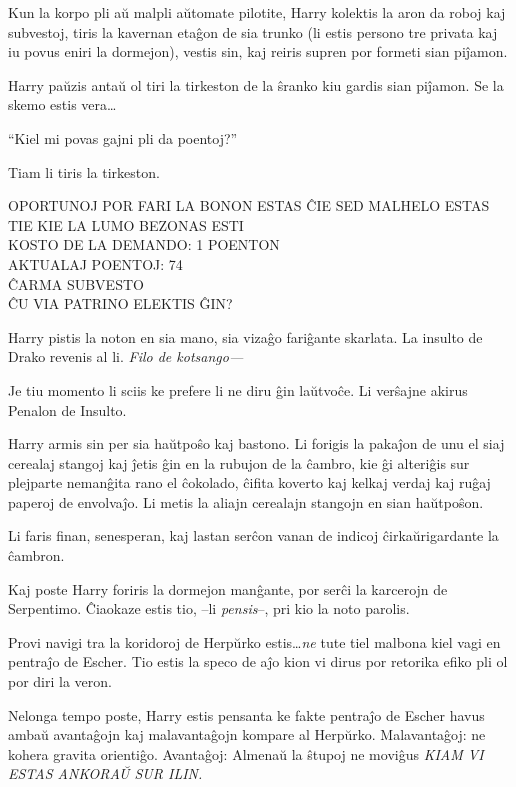Kun la korpo pli aŭ malpli aŭtomate pilotite, Harry kolektis la aron
da roboj kaj subvestoj, tiris la kavernan etaĝon de sia trunko (li estis
persono tre privata kaj iu povus eniri la dormejon), vestis
sin, kaj reiris supren por formeti sian piĵamon.

Harry paŭzis antaŭ ol tiri la tirkeston de la ŝranko kiu gardis sian piĵamon. Se
la skemo estis vera\ldots

``Kiel mi povas gajni pli da poentoj?''

Tiam li tiris la tirkeston.

\begin{center}
OPORTUNOJ POR FARI LA BONON ESTAS ĈIE SED MALHELO ESTAS TIE KIE LA
LUMO BEZONAS ESTI \\
KOSTO DE LA DEMANDO: 1 POENTON\\
AKTUALAJ POENTOJ: 74\\
ĈARMA SUBVESTO \\
ĈU VIA PATRINO ELEKTIS ĜIN? \\
\end{center}

Harry pistis la noton en sia mano, sia vizaĝo fariĝante skarlata. La
insulto de Drako revenis al li. \emph{Filo de kotsango—}

Je tiu momento li sciis ke prefere li ne diru ĝin laŭtvoĉe. Li
verŝajne akirus Penalon de Insulto.

Harry armis sin per sia haŭtpoŝo kaj bastono. Li forigis la pakaĵon de unu el
siaj cerealaj stangoj kaj ĵetis ĝin en la rubujon de la ĉambro, kie ĝi alteriĝis
sur plejparte nemanĝita rano el ĉokolado, ĉifita koverto kaj kelkaj verdaj kaj
ruĝaj paperoj de envolvaĵo. Li metis la aliajn cerealajn stangojn en sian
haŭtpoŝon.

Li faris finan, senesperan, kaj lastan serĉon vanan de indicoj
ĉirkaŭrigardante la ĉambron.

Kaj poste Harry foriris la dormejon manĝante, por serĉi la karcerojn de
Serpentimo. Ĉiaokaze estis tio, --li \emph{pensis}--, pri kio la noto parolis.

Provi navigi tra la koridoroj de Herpŭrko estis\ldots \emph{ne} tute tiel malbona
kiel vagi en pentraĵo de Escher. Tio estis la speco de aĵo kion vi dirus por
retorika efiko pli ol por diri la veron.

Nelonga tempo poste, Harry estis pensanta ke fakte pentraĵo de Escher
havus ambaŭ avantaĝojn kaj malavantaĝojn kompare al
Herpŭrko. Malavantaĝoj: ne kohera gravita orientiĝo. Avantaĝoj:
Almenaŭ la ŝtupoj ne moviĝus \emph{KIAM VI ESTAS ANKORAŬ SUR ILIN.}

